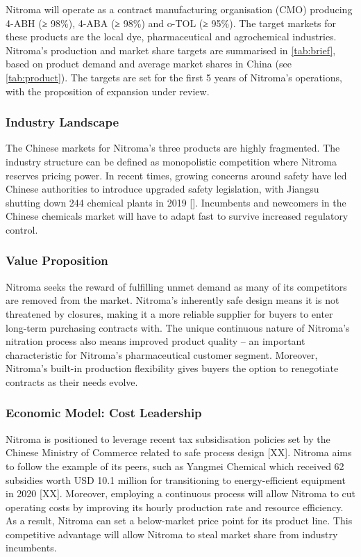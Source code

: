 Nitroma will operate as a contract manufacturing organisation (CMO) producing 4-ABH (≥ 98\%), 4-ABA (≥ 98\%) and o-TOL (≥ 95\%). The target markets for these products are the local dye, pharmaceutical and agrochemical industries. Nitroma’s production and market share targets are summarised in \cref{tab:brief}, based on product demand and average market shares in China (see \cref{tab:product}). The targets are set for the first 5 years of Nitroma’s operations, with the proposition of expansion under review.


\subsubsection{Industry Landscape}
The Chinese markets for Nitroma’s three products are highly fragmented. The industry structure can be defined as monopolistic competition where Nitroma reserves pricing power. In recent times, growing concerns around safety have led Chinese authorities to introduce upgraded safety legislation, with Jiangsu shutting down 244 chemical plants in 2019 []. Incumbents and newcomers in the Chinese chemicals market will have to adapt fast to survive increased regulatory control.


\subsubsection{Value Proposition}
Nitroma seeks the reward of fulfilling unmet demand as many of its competitors are removed from the market. Nitroma’s inherently safe design means it is not threatened by closures, making it a more reliable supplier for buyers to enter long-term purchasing contracts with. The unique continuous nature of Nitroma’s nitration process also means improved product quality – an important characteristic for Nitroma’s pharmaceutical customer segment. Moreover, Nitroma’s built-in production flexibility gives buyers the option to renegotiate contracts as their needs evolve. %

\subsubsection{Economic Model: Cost Leadership}
Nitroma is positioned to leverage recent tax subsidisation policies set by the Chinese Ministry of Commerce related to safe process design [XX]. Nitroma aims to follow the example of its peers, such as Yangmei Chemical which received 62 subsidies worth USD 10.1 million for transitioning to energy-efficient equipment in 2020 [XX]. Moreover, employing a continuous process will allow Nitroma to cut operating costs by improving its hourly production rate and resource efficiency. As a result, Nitroma can set a below-market price point for its product line. This competitive advantage will allow Nitroma to steal market share from industry incumbents. 

